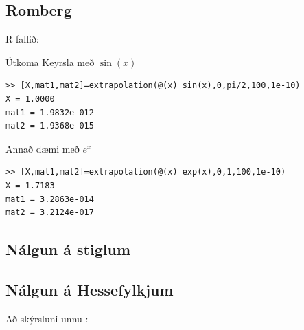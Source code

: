 \documentclass[a4]{article}
\begin{document}
\subsection{Romberg}
R fallið:

Útkoma
Keyrsla með $\sin(x)$
\begin{lstlisting}
>> [X,mat1,mat2]=extrapolation(@(x) sin(x),0,pi/2,100,1e-10)
X = 1.0000
mat1 = 1.9832e-012
mat2 = 1.9368e-015
\end{lstlisting}  
Annað dæmi með $e^x$
\begin{lstlisting}
>> [X,mat1,mat2]=extrapolation(@(x) exp(x),0,1,100,1e-10)
X = 1.7183
mat1 = 3.2863e-014
mat2 = 3.2124e-017
\end{lstlisting}

\subsection{Nálgun á stiglum}
\subsection{Nálgun á Hessefylkjum}
\vspace{20 mm}
Að skýrsluni unnu :
\hspace{0.5cm} \makebox[1.5in]{\hrulefill}
\hspace{0.5cm} \makebox[1.5in]{\hrulefill}
\hspace{0.5cm} \makebox[1.5in]{\hrulefill}
\end{document}
